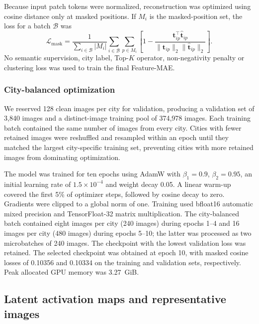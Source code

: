 Because input patch tokens were normalized, reconstruction was optimized using
cosine distance only at masked positions. If $M_i$ is the masked-position set,
the loss for a batch $\mathcal{B}$ was
\begin{equation}
  \mathcal{L}_{\mathrm{mask}}
  = \frac{1}{\sum_{i\in\mathcal{B}}|M_i|}
    \sum_{i\in\mathcal{B}}
    \sum_{p\in M_i}
    \left[
      1-
      \frac{\mathbf{t}_{ip}^{\top}\widehat{\mathbf{t}}_{ip}}
      {\lVert\mathbf{t}_{ip}\rVert_2
       \lVert\widehat{\mathbf{t}}_{ip}\rVert_2}
    \right].
  \label{eq:masked_cosine_loss}
\end{equation}
No semantic supervision, city label, Top-$K$ operator, non-negativity penalty or
clustering loss was used to train the final Feature-MAE.

\subsubsection{City-balanced optimization}

We reserved 128 clean images per city for validation, producing a validation
set of 3,840 images and a distinct-image training pool of 374,978 images. Each
training batch contained the same number of images from every city. Cities with
fewer retained images were reshuffled and resampled within an epoch until they
matched the largest city-specific training set, preventing cities with more
retained images from dominating optimization.

The model was trained for ten epochs using AdamW with
$\beta_1=0.9$, $\beta_2=0.95$, an initial learning rate of
$1.5\times10^{-4}$ and weight decay 0.05. A linear warm-up covered the first
5\% of optimizer steps, followed by cosine decay to zero. Gradients were clipped
to a global norm of one. Training used bfloat16 automatic mixed precision and
TensorFloat-32 matrix multiplication. The city-balanced batch contained eight
images per city (240 images) during epochs 1--4 and 16 images per city (480
images) during epochs 5--10; the latter was processed as two microbatches of 240
images. The checkpoint with the lowest validation loss was retained. The selected
checkpoint was obtained at epoch 10, with masked cosine losses of 0.10356 and
0.10334 on the training and validation sets, respectively. Peak allocated GPU
memory was 3.27~GiB.

\subsection{Latent activation maps and representative images}
\label{sec:latent_heatmaps}

